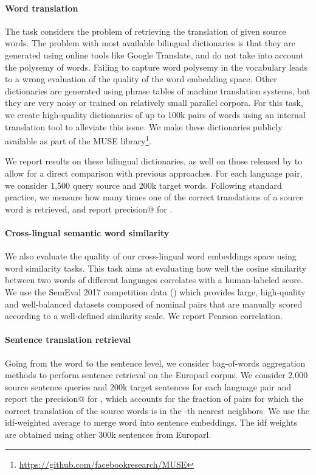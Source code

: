 \documentclass{article} \usepackage{iclr2018_conference,times}
\begin{document}
\paragraph{Word translation}
The task considers the problem of retrieving the translation of given source words. 
The problem with most available bilingual dictionaries is that they are generated using online tools like Google Translate, and do not take into account the polysemy of words. Failing to capture word polysemy in the vocabulary leads to a wrong evaluation of the quality of the word embedding space.
Other dictionaries are generated using phrase tables of machine translation systems, but they are very noisy or trained on relatively small parallel corpora. 
For this task, we create high-quality dictionaries of up to 100k pairs of words using an internal translation tool to alleviate this issue. We make these dictionaries publicly available as part of the MUSE library\footnote{\url{https://github.com/facebookresearch/MUSE}}.


We report results on these bilingual dictionaries, as well on those released by \cite{dinu2014improving} to allow for a direct comparison with previous approaches. For each language pair, we consider 1,500 query source and 200k target words. Following standard practice, we measure how many times one of the correct translations of a source word is retrieved, and report precision@ for .

\paragraph{Cross-lingual semantic word similarity}
We also evaluate the quality of our cross-lingual word embeddings space using word similarity tasks. This task aims at evaluating how well the cosine similarity between two words of different languages correlates with a human-labeled score. We use the SemEval 2017 competition data (\cite{camacho2017semeval}) which provides large, high-quality and well-balanced datasets composed of nominal pairs that are manually scored according to a well-defined similarity scale. We report Pearson correlation.

\paragraph{Sentence translation retrieval}
Going from the word to the sentence level, we consider bag-of-words aggregation methods to perform sentence retrieval on the Europarl corpus. We consider 2,000 source sentence queries and 200k target sentences for each language pair and report the precision@ for , which accounts for the fraction of pairs for which the correct translation of the source words is in the -th nearest neighbors. We use the idf-weighted average to merge word into sentence embeddings.
The idf weights are obtained using other 300k sentences from Europarl.
\end{document}
